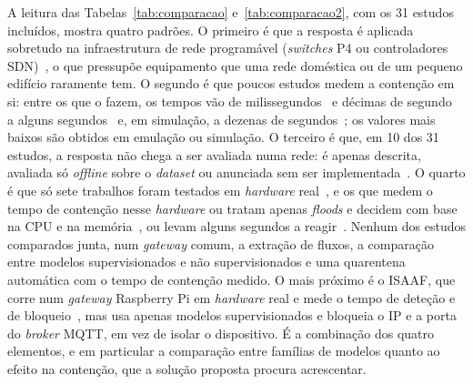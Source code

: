 \documentclass[conference,a4paper]{IEEEtran}
\begin{document}
A leitura das Tabelas~\ref{tab:comparacao} e~\ref{tab:comparacao2}, com os 31 estudos incluídos, mostra quatro padrões. O primeiro é que a resposta é aplicada
sobretudo na infraestrutura de rede programável (\textit{switches} P4 ou controladores
SDN)~\cite{ramirezmartinez2025p4,andrade2024ddos,elsayed2024mpguard,zolotukhin2021curious,tawfik2021internet,Iqbal2026,Chaudhary2025,toony2024multiblock,gowtham2026fedmp,mazhar2022ridps,garba2024sdn,karibandi2025cyberdome},
o que pressupõe equipamento que uma rede doméstica ou de um pequeno edifício raramente
tem. O segundo é que poucos estudos medem a contenção em si: entre os que o fazem, os
tempos vão de milissegundos~\cite{toony2024multiblock,shukla2026cyber} e décimas de
segundo~\cite{ramirezmartinez2025p4,kponyo2020lightweight} a alguns
segundos~\cite{andrade2024ddos,karam2025isaaf,srilekha2025hybrid} e, em simulação, a
dezenas de segundos~\cite{Rasheed2026}; os valores mais baixos são obtidos em emulação ou
simulação. O terceiro é que, em 10 dos 31 estudos, a
resposta não chega a ser avaliada numa rede: é apenas descrita, avaliada só
\textit{offline} sobre o \textit{dataset} ou anunciada sem ser
implementada~\cite{dange2025dual,tawfik2021internet,saurabh2022mlaps,rawat2024intelligent,Arulkumar2026,Chaudhary2025,hussain2026postquantum,verma2024petrak,tariq2025saegru,kumar2025advanced}.
O quarto é que só sete trabalhos foram testados em \textit{hardware}
real~\cite{ravi2020semisupervised,dange2025dual,kponyo2020lightweight,Iqbal2026,karam2025isaaf,srilekha2025hybrid,garba2024sdn},
e os que medem o tempo de contenção nesse \textit{hardware} ou tratam apenas
\textit{floods} e decidem com base na CPU e na memória~\cite{kponyo2020lightweight}, ou
levam alguns segundos a reagir~\cite{karam2025isaaf,srilekha2025hybrid}.
Nenhum dos estudos comparados junta, num \textit{gateway} comum, a extração de fluxos, a
comparação entre modelos supervisionados e não supervisionados e uma quarentena
automática com o tempo de contenção medido. O mais próximo é o ISAAF, que corre num
\textit{gateway} Raspberry Pi em \textit{hardware} real e mede o tempo de deteção e de
bloqueio~\cite{karam2025isaaf}, mas usa apenas modelos supervisionados e bloqueia o IP
e a porta do \textit{broker} MQTT, em vez de isolar o dispositivo. É a combinação dos
quatro elementos, e em particular a comparação entre famílias de modelos quanto ao efeito
na contenção, que a solução proposta procura acrescentar.

\end{document}
